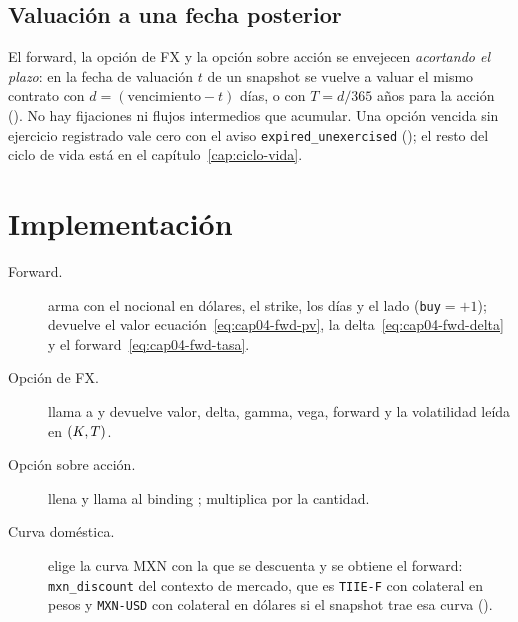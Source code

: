 \subsection{Valuación a una fecha posterior}\label{sec:cap04-aging}

El forward, la opción de FX y la opción sobre acción se envejecen \emph{acortando el plazo}: en la fecha de
valuación $t$ de un snapshot se vuelve a valuar el mismo contrato con $d=(\text{vencimiento}-t)$ días, o con
$T=d/365$ años para la acción (). No hay fijaciones ni flujos
intermedios que acumular. Una opción vencida sin ejercicio registrado vale cero con el aviso
\texttt{expired\_unexercised} (); el resto del ciclo de vida está en
el capítulo~\ref{cap:ciclo-vida}.

\section{Implementación}\label{sec:cap04-implementacion}

\begin{description}
  \item[Forward.]  arma
     con el nocional en dólares, el strike, los días y el lado
    (\texttt{buy}$=+1$);  devuelve el valor
    ecuación~\eqref{eq:cap04-fwd-pv}, la delta~\eqref{eq:cap04-fwd-delta} y el forward~\eqref{eq:cap04-fwd-tasa}.
  \item[Opción de FX.]  llama a
     y devuelve valor, delta, gamma, vega, forward y
    la volatilidad leída en $(K,T)$.
  \item[Opción sobre acción.]  llena
     y llama al binding ;
     multiplica por la cantidad.
  \item[Curva doméstica.]  elige la curva MXN con la que se descuenta
    y se obtiene el forward: \texttt{mxn\_discount} del contexto de mercado,
    que es \texttt{TIIE-F} con colateral en pesos y \texttt{MXN-USD} con colateral en dólares si el snapshot trae
    esa curva ().
\end{description}

